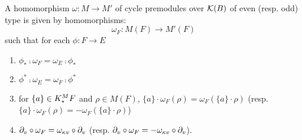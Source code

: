 \begin{definition}
A homomorphism $\omega: M \to M'$ of cycle premodules over 
$\mathcal{K}(B)$ of even (resp. odd) type is given by homomorphisms:
\[
\omega_F: M(F) \to M'(F)
\]
such that for each $\phi: F \to E$
\begin{enumerate}
\item $\phi_* \comp \omega_F = \omega_E \comp \phi_*$

\item $\phi^* \comp \omega_E = \omega_F \comp \phi^*$

\item for $\{a\} \in K^M_*F$ and $\rho \in M(F)$, $\{a\} \cdot 
\omega_F(\rho) = \omega_F(\{a\} \cdot \rho)$ (resp. 
$\{a\} \cdot \omega_F(\rho) = -\omega_F(\{a\} \cdot \rho)$)

\item $\partial_{v} \circ \omega_F = \omega_{\kappa{v}} \circ \partial_{v}$
(resp. $\partial_{v} \circ \omega_F = -\omega_{\kappa{v}} \circ 
\partial_{v}$).
\end{enumerate}
\end{definition}
